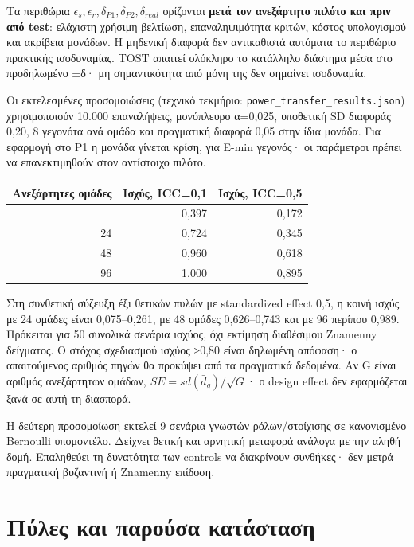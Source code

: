 \documentclass[
  10pt,
  a4paper,
]{report}
\begin{document}
Τα περιθώρια
\(\epsilon_s,\epsilon_r,\delta_{P1},\delta_{P2},\delta_{real}\)
ορίζονται \textbf{μετά τον ανεξάρτητο πιλότο και πριν από test}:
ελάχιστη χρήσιμη βελτίωση, επαναληψιμότητα κριτών, κόστος υπολογισμού
και ακρίβεια μονάδων. Η μηδενική διαφορά δεν αντικαθιστά αυτόματα το
περιθώριο πρακτικής ισοδυναμίας. TOST απαιτεί ολόκληρο το κατάλληλο
διάστημα μέσα στο προδηλωμένο ±δ· μη σημαντικότητα από μόνη της δεν
σημαίνει ισοδυναμία.

Οι εκτελεσμένες προσομοιώσεις (τεχνικό τεκμήριο:
\texttt{power\_transfer\_results.json}) χρησιμοποιούν 10.000
επαναλήψεις, μονόπλευρο α=0,025, υποθετική SD διαφοράς 0,20, 8 γεγονότα
ανά ομάδα και πραγματική διαφορά 0,05 στην ίδια μονάδα. Για εφαρμογή στο
P1 η μονάδα γίνεται κρίση, για E-min γεγονός· οι παράμετροι πρέπει να
επανεκτιμηθούν στον αντίστοιχο πιλότο.

\begin{longtable}[]{@{}rrr@{}}
\toprule\noalign{}
Ανεξάρτητες ομάδες & Ισχύς, ICC=0,1 & Ισχύς, ICC=0,5 \\
\midrule\noalign{}
\endhead
\bottomrule\noalign{}
\endlastfoot
12 & 0,397 & 0,172 \\
24 & 0,724 & 0,345 \\
48 & 0,960 & 0,618 \\
96 & 1,000 & 0,895 \\
\end{longtable}

Στη συνθετική σύζευξη έξι θετικών πυλών με standardized effect 0,5, η
κοινή ισχύς με 24 ομάδες είναι 0,075--0,261, με 48 ομάδες 0,626--0,743
και με 96 περίπου 0,989. Πρόκειται για 50 συνολικά σενάρια ισχύος, όχι
εκτίμηση διαθέσιμου Znamenny δείγματος. Ο στόχος σχεδιασμού ισχύος ≥0,80
είναι δηλωμένη απόφαση· ο απαιτούμενος αριθμός πηγών θα προκύψει από τα
πραγματικά δεδομένα. Αν G είναι αριθμός ανεξάρτητων ομάδων,
\(SE=sd(\bar d_g)/\sqrt G\)· ο design effect δεν εφαρμόζεται ξανά σε
αυτή τη διασπορά.

Η δεύτερη προσομοίωση εκτελεί 9 σενάρια γνωστών ρόλων/στοίχισης σε
κανονισμένο Bernoulli υπομοντέλο. Δείχνει θετική και αρνητική μεταφορά
ανάλογα με την αληθή δομή. Επαληθεύει τη δυνατότητα των controls να
διακρίνουν συνθήκες· δεν μετρά πραγματική βυζαντινή ή Znamenny επίδοση.

\section{Πύλες και παρούσα
κατάσταση}\label{ux3c0ux3cdux3bbux3b5ux3c2-ux3baux3b1ux3b9-ux3c0ux3b1ux3c1ux3bfux3cdux3c3ux3b1-ux3baux3b1ux3c4ux3acux3c3ux3c4ux3b1ux3c3ux3b7}
\end{document}
